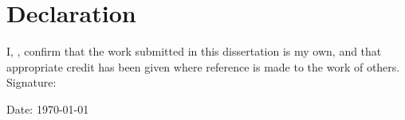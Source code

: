 
\section*{Declaration}

\vspace{10mm}

I, \Name{}, confirm that the work submitted in this dissertation is my own, and
that appropriate credit has been given where reference is made to the work of
others.
\\[8mm]
\noindent Signature:


\begin{figure}[h]
\end{figure}

\noindent Date: \today

\newpage
